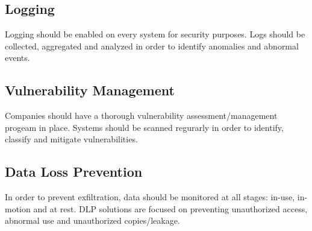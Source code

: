	\subsection{Logging}
	Logging should be enabled on every system for security purposes. Logs should be collected, aggregated and analyzed in order to identify anomalies and abnormal events.
	\subsection{Vulnerability Management}
	Companies should have a thorough vulnerability assessment/management progeam in place. Systems should be scanned regurarly in order to identify, classify and mitigate vulnerabilities.
	\subsection{Data Loss Prevention}
	In order to prevent exfiltration, data should be monitored at all stages: in-use, in-motion and at rest. DLP solutions are focused on preventing unauthorized access, abnormal use and unauthorized copies/leakage.
